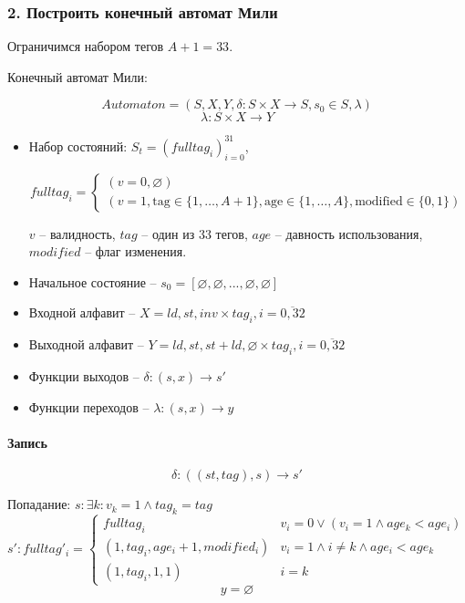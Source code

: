 
\subsubsection*{2. Построить конечный автомат Мили}

Ограничимся набором тегов $A + 1 = 33$.
\par\medskip

Конечный автомат Мили:

$$Automaton = (S,X,Y,\delta:S\times X \rightarrow S, s_0 \in S, \lambda)$$
$$\lambda : S\times X \rightarrow Y$$

\begin{itemize}[itemindent=0pt,leftmargin=0em,topsep=0pt,itemsep=-1ex,partopsep=1ex,parsep=1ex]
	\item Набор состояний: $S_t = (fulltag_i)^{31}_{i=0}$,

	\[
	fulltag_i =
	\begin{cases}
	  (v = 0, \varnothing) \\
	  (v = 1, \text{tag} \in \{1, \dots, A+1\}, \text{age} \in \{1, \dots, A\}, \text{modified} \in \{0,1\})
	\end{cases}
	\]

	$v$ -- валидность, $tag$ -- один из 33 тегов, $age$ -- давность использования, $modified$ -- флаг изменения.
	\par\medskip

	\item Начальное состояние -- $s_0 = [\varnothing,\varnothing,...,\varnothing,\varnothing]$
	\item Входной алфавит -- $X = {ld,st,inv}\times{tag_i,i=\overline{0,32}}$
	\item Выходной алфавит -- $Y = {ld,st,st+ld,\varnothing}\times{tag_i,i=\overline{0,32}}$
	\item Функции выходов -- $\delta: (s,x)\rightarrow s'$
	\item Функции переходов -- $\lambda: (s,x) \rightarrow y$
\end{itemize}

\paragraph*{Запись}

$$\delta : ((st,tag),s) \rightarrow s'$$

Попадание: $s: \exists k : v_k = 1 \land tag_k = tag$
\[
s':fulltag'_i =
\begin{cases}
	fulltag_i & v_i = 0 \lor (v_i = 1 \land age_k < age_i)\\
	(1,tag_i,age_{i}+1,modified_i) & v_i = 1 \land i \neq k \land age_i < age_k \\
	(1,tag_i,1,1) & i = k
\end{cases}
\]
$$y = \varnothing$$

